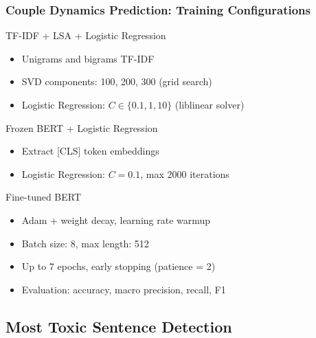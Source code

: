 \documentclass{beamer}
\begin{document}
\begin{frame}
\frametitle{Couple Dynamics Prediction: Training Configurations}

\begin{block}{TF-IDF + LSA + Logistic Regression}
\begin{itemize}
\item Unigrams and bigrams TF-IDF
\item SVD components: 100, 200, 300 (grid search)
\item Logistic Regression: $C \in \{0.1, 1, 10\}$ (liblinear solver)
\end{itemize}
\end{block}

\begin{block}{Frozen BERT + Logistic Regression}
\begin{itemize}
\item Extract [CLS] token embeddings
\item Logistic Regression: $C = 0.1$, max 2000 iterations
\end{itemize}
\end{block}

\begin{exampleblock}{Fine-tuned BERT}
\begin{itemize}
\item Adam + weight decay, learning rate warmup
\item Batch size: 8, max length: 512
\item Up to 7 epochs, early stopping (patience = 2)
\item Evaluation: accuracy, macro precision, recall, F1
\end{itemize}
\end{exampleblock}

\end{frame}

\subsection{Most Toxic Sentence Detection}
\end{document}
